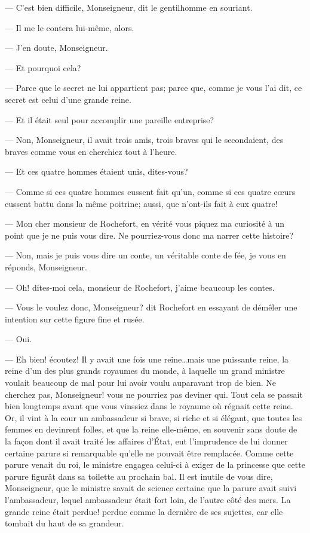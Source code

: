 — C'est bien difficile, Monseigneur, dit le gentilhomme en souriant.

— Il me le contera lui-même, alors.

— J'en doute, Monseigneur.

— Et pourquoi cela?

— Parce que le secret ne lui appartient pas; parce que, comme je vous l'ai dit, ce secret est celui d'une grande reine.

— Et il était seul pour accomplir une pareille entreprise?

— Non, Monseigneur, il avait trois amis, trois braves qui le secondaient, des braves comme vous en cherchiez tout à l'heure.

— Et ces quatre hommes étaient unis, dites-vous?

— Comme si ces quatre hommes eussent fait qu'un, comme si ces quatre cœurs eussent battu dans la même poitrine; aussi, que n'ont-ils fait à eux quatre!

— Mon cher monsieur de Rochefort, en vérité vous piquez ma curiosité à un point que je ne puis vous dire. Ne pourriez-vous donc ma narrer cette histoire?

— Non, mais je puis vous dire un conte, un véritable conte de fée, je vous en réponds, Monseigneur.

— Oh! dites-moi cela, monsieur de Rochefort, j'aime beaucoup les contes.

— Vous le voulez donc, Monseigneur? dit Rochefort en essayant de démêler une intention sur cette figure fine et rusée.

— Oui.

— Eh bien! écoutez! Il y avait une fois une reine\dots mais une puissante reine, la reine d'un des plus grands royaumes du monde, à laquelle un grand ministre voulait beaucoup de mal pour lui avoir voulu auparavant trop de bien. Ne cherchez pas, Monseigneur! vous ne pourriez pas deviner qui. Tout cela se passait bien longtemps avant que vous vinssiez dans le royaume où régnait cette reine. Or, il vint à la cour un ambassadeur si brave, si riche et si élégant, que toutes les femmes en devinrent folles, et que la reine elle-même, en souvenir sans doute de la façon dont il avait traité les affaires d'État, eut l'imprudence de lui donner certaine parure si remarquable qu'elle ne pouvait être remplacée. Comme cette parure venait du roi, le ministre engagea celui-ci à exiger de la princesse que cette parure figurât dans sa toilette au prochain bal. Il est inutile de vous dire, Monseigneur, que le ministre savait de science certaine que la parure avait suivi l'ambassadeur, lequel ambassadeur était fort loin, de l'autre côté des mers. La grande reine était perdue! perdue comme la dernière de ses sujettes, car elle tombait du haut de sa grandeur.

